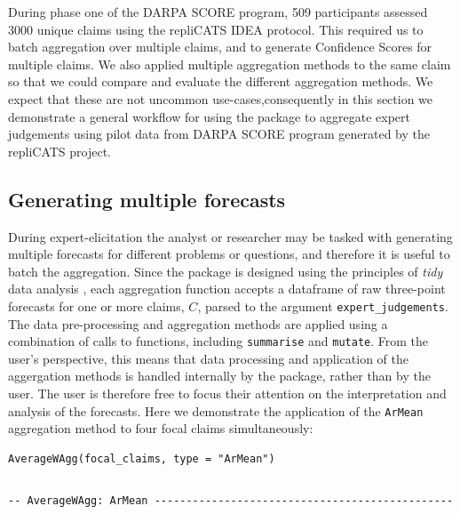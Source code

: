 \documentclass[article]{jss}
\begin{document}
During phase one of the DARPA SCORE program, 509 participants assessed
3000 unique claims using the repliCATS IDEA protocol. This required us
to batch aggregation over multiple claims, and to generate Confidence
Scores for multiple claims. We also applied multiple aggregation methods
to the same claim so that we could compare and evaluate the different
aggregation methods. We expect that these are not uncommon
use-cases,consequently in this section we demonstrate a general workflow
for using the  package to aggregate expert judgements
using pilot data from DARPA SCORE program generated by the repliCATS
project.

\hypertarget{generating-multiple-forecasts}{%
\subsection{Generating multiple
forecasts}\label{generating-multiple-forecasts}}

During expert-elicitation the analyst or researcher may be tasked with
generating multiple forecasts for different problems or questions, and
therefore it is useful to batch the aggregation. Since the
 package is designed using the principles of \emph{tidy}
data analysis \citep{tidyverse2019}, each aggregation function accepts a
dataframe of raw three-point forecasts for one or more claims, \(C\),
parsed to the argument \texttt{expert\_judgements}. The data
pre-processing and aggregation methods are applied using a combination
of calls to  functions, including \texttt{summarise} and
\texttt{mutate}. From the user's perspective, this means that data
processing and application of the aggergation methods is handled
internally by the  package, rather than by the user. The
user is therefore free to focus their attention on the interpretation
and analysis of the forecasts. Here we demonstrate the application of
the \texttt{ArMean} aggregation method to four focal claims
simultaneously:

\begin{verbatim}
AverageWAgg(focal_claims, type = "ArMean")
\end{verbatim}

\begin{verbatim}
\end{verbatim}

\begin{verbatim}
-- AverageWAgg: ArMean -----------------------------------------------
\end{verbatim}
\end{document}
